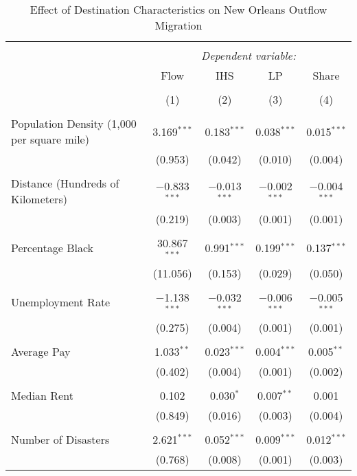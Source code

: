 \documentclass[]{article}
\begin{document}
\clearpage
\scriptsize

\begin{table}[!htbp] \centering 
  \caption{\label{reg:regmain}Effect of Destination Characteristics on New Orleans Outflow Migration} 
  \label{} 
\scriptsize 
\begin{tabular}{@{\extracolsep{5pt}}lcccc} 
\\[-1.8ex]\hline 
\hline \\[-1.8ex] 
 & \multicolumn{4}{c}{\textit{Dependent variable:}} \\ 
\cline{2-5} 
 & Flow & IHS & LP & Share \\ 
\\[-1.8ex] & (1) & (2) & (3) & (4)\\ 
\hline \\[-1.8ex] 
 Population Density (1,000 per square mile) & 3.169$^{***}$ & 0.183$^{***}$ & 0.038$^{***}$ & 0.015$^{***}$ \\ 
  & (0.953) & (0.042) & (0.010) & (0.004) \\ 
  & & & & \\ 
 Distance (Hundreds of Kilometers) & $-$0.833$^{***}$ & $-$0.013$^{***}$ & $-$0.002$^{***}$ & $-$0.004$^{***}$ \\ 
  & (0.219) & (0.003) & (0.001) & (0.001) \\ 
  & & & & \\ 
 Percentage Black & 30.867$^{***}$ & 0.991$^{***}$ & 0.199$^{***}$ & 0.137$^{***}$ \\ 
  & (11.056) & (0.153) & (0.029) & (0.050) \\ 
  & & & & \\ 
 Unemployment Rate & $-$1.138$^{***}$ & $-$0.032$^{***}$ & $-$0.006$^{***}$ & $-$0.005$^{***}$ \\ 
  & (0.275) & (0.004) & (0.001) & (0.001) \\ 
  & & & & \\ 
 Average Pay & 1.033$^{**}$ & 0.023$^{***}$ & 0.004$^{***}$ & 0.005$^{**}$ \\ 
  & (0.402) & (0.004) & (0.001) & (0.002) \\ 
  & & & & \\ 
 Median Rent & 0.102 & 0.030$^{*}$ & 0.007$^{**}$ & 0.001 \\ 
  & (0.849) & (0.016) & (0.003) & (0.004) \\ 
  & & & & \\ 
 Number of Disasters & 2.621$^{***}$ & 0.052$^{***}$ & 0.009$^{***}$ & 0.012$^{***}$ \\ 
  & (0.768) & (0.008) & (0.001) & (0.003) \\ 

\end{tabular}
\end{table}
\end{document}
